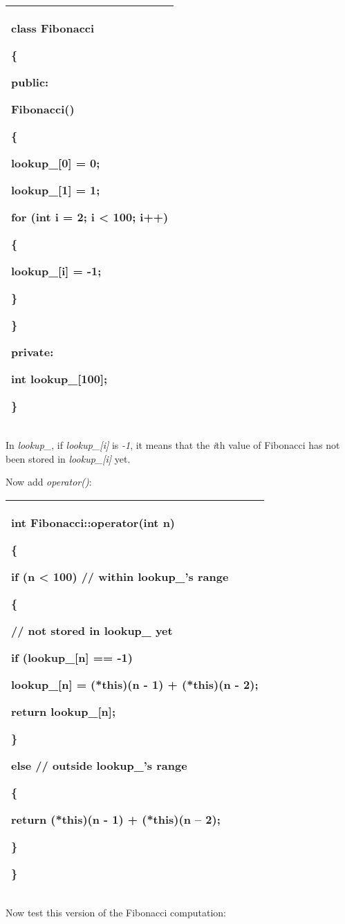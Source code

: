 \documentclass[
]{article}
\begin{document}
\begin{longtable}[]{@{}l@{}}
\toprule
\endhead
\begin{minipage}[t]{0.97\columnwidth}\raggedright
class Fibonacci

\{

public:

Fibonacci()

\{

lookup\_{[}0{]} = 0;

lookup\_{[}1{]} = 1;

for (int i = 2; i \textless{} 100; i++)

\{

lookup\_{[}i{]} = -1;

\}

\}

private:

int lookup\_{[}100{]};

\}\strut
\end{minipage}\tabularnewline
\bottomrule
\end{longtable}

In \emph{lookup\_}, if \emph{lookup\_{[}i{]}} is \emph{-1}, it means
that the \emph{i}th value of Fibonacci has not been stored in
\emph{lookup\_{[}i{]}} yet.

Now add \emph{operator()}:

\begin{longtable}[]{@{}l@{}}
\toprule
\endhead
\begin{minipage}[t]{0.97\columnwidth}\raggedright
int Fibonacci::operator(int n)

\{

if (n \textless{} 100) // within lookup\_'s range

\{

// not stored in lookup\_ yet

if (lookup\_{[}n{]} == -1)

lookup\_{[}n{]} = (*this)(n - 1) + (*this)(n - 2);

return lookup\_{[}n{]};

\}

else // outside lookup\_'s range

\{

return (*this)(n - 1) + (*this)(n -- 2);

\}

\}\strut
\end{minipage}\tabularnewline
\bottomrule
\end{longtable}

Now test this version of the Fibonacci computation:
\end{document}
